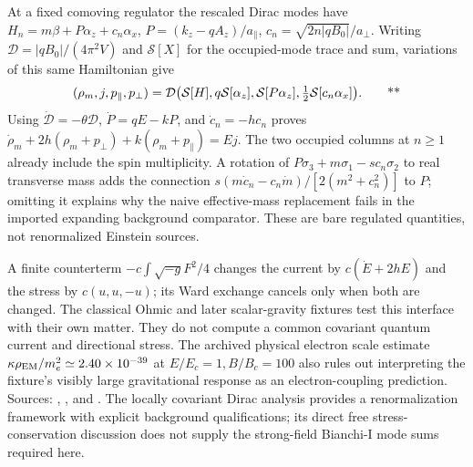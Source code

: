 At a fixed comoving regulator the rescaled Dirac modes have
\(H_n=m\beta+P\alpha_z+c_n\alpha_x\),
\(P=(k_z-qA_z)/a_\parallel\), \(c_n=\sqrt{2n|qB_0|}/a_\perp\).
Writing \(\mathcal D=|qB_0|/(4\pi^2V)\) and \(\mathcal S[X]\) for the
occupied-mode trace and sum, variations of this same Hamiltonian give
\begin{equation}
 (\rho_m,j,p_\parallel,p_\perp)=\mathcal D
 \big(\mathcal S[H],q\mathcal S[\alpha_z],
 \mathcal S[P\alpha_z],\tfrac12\mathcal S[c_n\alpha_x]\big).
 \qquad\text{**}\label{early:pressures}
\end{equation}
Using \(\dot{\mathcal D}=-\theta\mathcal D\),
\(\dot P=qE-kP\), and \(\dot c_n=-hc_n\) proves
\(\dot\rho_m+2h(\rho_m+p_\perp)+k(\rho_m+p_\parallel)=Ej\).
The two occupied columns at \(n\ge1\) already include the spin multiplicity.
A rotation of \(P\sigma_3+m\sigma_1-sc_n\sigma_2\) to real transverse mass
adds the connection
\(s(m\dot c_n-c_n\dot m)/[2(m^2+c_n^2)]\) to \(P\); omitting it explains
why the naive effective-mass replacement fails in the imported expanding
background comparator.  These are bare regulated quantities, not renormalized
Einstein sources.

A finite counterterm \(-c\int\sqrt{-g}F^2/4\) changes the current by
\(c(\dot E+2hE)\) and the stress by \(c(u,u,-u)\); its Ward exchange cancels
only when both are changed.  The classical Ohmic and later scalar-gravity
fixtures test this interface with their own matter.  They do not compute a
common covariant quantum current and directional stress.  The archived physical
electron scale estimate \(\kappa\rho_{\rm EM}/m_e^2\simeq2.40\times10^{-39}\)
at \(E/E_c=1,B/B_c=100\) also rules out interpreting the fixture's visibly
large gravitational response as an electron-coupling prediction.  Sources:
,
,
and .
The locally covariant Dirac analysis \cite{zahn2014dirac} provides a
renormalization framework with explicit background qualifications; its direct
free stress-conservation discussion does not supply the strong-field
Bianchi-I mode sums required here.

